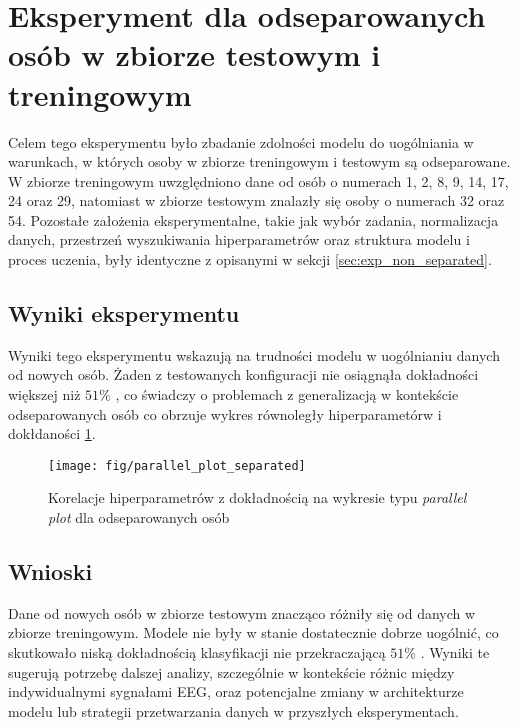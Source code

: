 \documentclass[eeg_v4.tex]{subfiles}
\begin{document}
    \section{Eksperyment dla odseparowanych osób w zbiorze testowym i treningowym}

    Celem tego eksperymentu było zbadanie zdolności modelu do uogólniania w warunkach, w których osoby w zbiorze
    treningowym i testowym są odseparowane. W zbiorze treningowym uwzględniono dane od osób o numerach 1, 2, 8, 9, 14,
    17, 24 oraz 29, natomiast w zbiorze testowym znalazły się osoby o numerach 32 oraz 54. Pozostałe założenia
    eksperymentalne, takie jak wybór zadania, normalizacja danych, przestrzeń wyszukiwania hiperparametrów oraz
    struktura modelu i proces uczenia, były identyczne z opisanymi w sekcji \ref{sec:exp_non_separated}.

    \subsection{Wyniki eksperymentu}

    Wyniki tego eksperymentu wskazują na trudności modelu w uogólnianiu danych od nowych osób. Żaden z testowanych
    konfiguracji nie osiągnąła dokładności większej niż \(51\%\)
    , co świadczy o problemach z generalizacją w kontekście odseparowanych osób co obrzuje wykres równoległy
    hiperparametórw i dokłdaności \ref{fig:parallel_plot_separated}.

    \begin{figure}[h!]
        \centering
        \texttt{[image: fig/parallel\_plot\_separated]}
        \caption
        {Korelacje hiperparametrów z dokładnością na wykresie typu \textit{parallel plot} dla odseparowanych osób}
        \label{fig:parallel_plot_separated}
    \end{figure}

    \subsection{Wnioski}

    Dane od nowych osób w zbiorze testowym znacząco różniły się od danych w zbiorze treningowym. Modele nie były w
    stanie dostatecznie dobrze uogólnić, co skutkowało niską dokładnością klasyfikacji nie przekraczającą \(51\%\)
    . Wyniki te sugerują potrzebę
    dalszej analizy, szczególnie w kontekście różnic między indywidualnymi sygnałami EEG, oraz potencjalne zmiany w
    architekturze modelu lub strategii przetwarzania danych w przyszłych eksperymentach.
\end{document}
